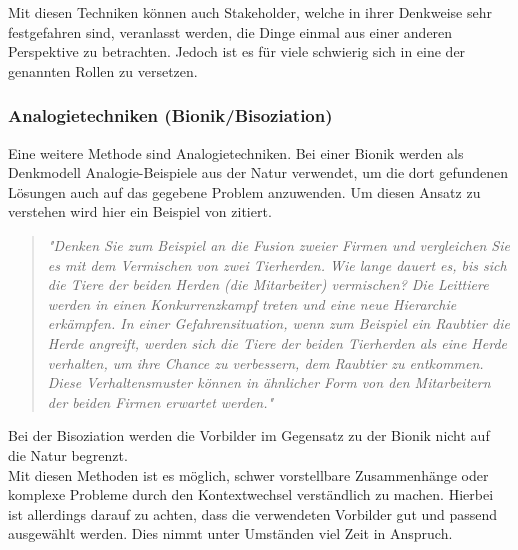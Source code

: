 Mit diesen Techniken können auch Stakeholder, welche in ihrer Denkweise sehr festgefahren sind, veranlasst werden, die Dinge einmal aus einer anderen Perspektive zu betrachten. Jedoch ist es für viele schwierig sich in eine der genannten Rollen zu versetzen.

\subsubsection{Analogietechniken (Bionik/Bisoziation)}
Eine weitere Methode sind Analogietechniken. Bei einer Bionik werden als Denkmodell Analogie-Beispiele aus der Natur verwendet, um die dort gefundenen Lösungen auch auf das gegebene Problem anzuwenden. Um diesen Ansatz zu verstehen wird hier ein Beispiel von \cite{Rupp2} zitiert.

\begin{quote}
\textit{"Denken Sie zum Beispiel an die Fusion zweier Firmen und vergleichen Sie es mit dem Vermischen von zwei Tierherden. Wie lange dauert es, bis sich die Tiere der beiden Herden (die Mitarbeiter) vermischen? Die Leittiere werden in einen Konkurrenzkampf treten und eine neue Hierarchie erkämpfen. In einer Gefahrensituation, wenn zum Beispiel ein Raubtier die Herde angreift, werden sich die Tiere der beiden Tierherden als eine Herde verhalten, um ihre Chance zu verbessern, dem Raubtier zu entkommen. Diese Verhaltensmuster können in ähnlicher Form von den Mitarbeitern der beiden Firmen erwartet werden."}
\end{quote}

Bei der Bisoziation werden die Vorbilder im Gegensatz zu der Bionik nicht auf die Natur begrenzt.\\

Mit diesen Methoden ist es möglich, schwer vorstellbare Zusammenhänge oder komplexe Probleme durch den Kontextwechsel verständlich zu machen. Hierbei ist allerdings darauf zu achten, dass die verwendeten Vorbilder gut und passend ausgewählt werden. Dies nimmt unter Umständen viel Zeit in Anspruch.

